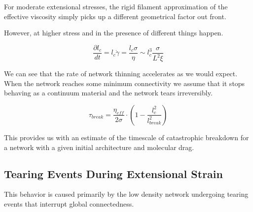 \documentclass[pre,reprint]{revtex4-1}
\begin{document}
For moderate extensional stresses, the rigid filament approximation of the effective viscosity simply picks up a different geometrical factor out front.  

However, at higher stress and in the presence of different things happen.

\begin{equation}
\frac{\partial l_c}{dt}=l_c\dot \gamma =\frac{l_c \sigma}{\eta}\sim l_c^3\frac{ \sigma}{L^2 \xi}
\end{equation}

We can see that the rate of network thinning accelerates as we would expect.  When the network reaches some minimum connectivity we assume that it stops behaving as a continuum material and the network tears irreversibly.  

\begin{equation}
\tau_{break} = \frac{\eta_{eff}}{2\sigma}\cdot\left ( 1 -\frac{l_c^2}{l_{break}^2} \right )
\end{equation}

This provides us with an estimate of the timescale of catastrophic breakdown for a network with a given initial architecture and molecular drag.


\subsection{Tearing Events During Extensional Strain}

This behavior is caused primarily by the low density network undergoing tearing events that interrupt global connectedness.  
\end{document}
